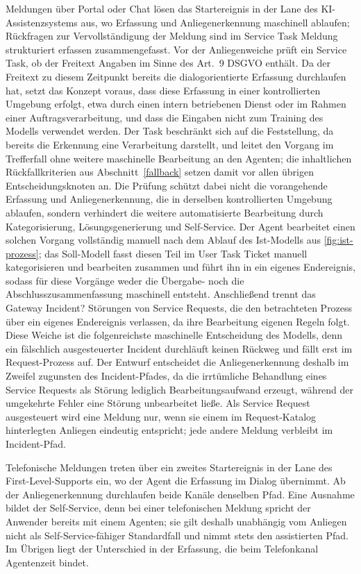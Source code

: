 Meldungen \"uber Portal oder Chat l\"osen das Startereignis in der Lane des KI-Assistenzsystems aus, wo Erfassung und Anliegenerkennung maschinell ablaufen; R\"uckfragen zur Vervollst\"andigung der Meldung sind im Service Task \glqq Meldung strukturiert erfassen\grqq{} zusammengefasst. Vor der Anliegenweiche pr\"uft ein Service Task, ob der Freitext Angaben im Sinne des Art.~9 DSGVO enth\"alt. Da der Freitext zu diesem Zeitpunkt bereits die dialogorientierte Erfassung durchlaufen hat, setzt das Konzept voraus, dass diese Erfassung in einer kontrollierten Umgebung erfolgt, etwa durch einen intern betriebenen Dienst oder im Rahmen einer Auftragsverarbeitung, und dass die Eingaben nicht zum Training des Modells verwendet werden. Der Task beschr\"ankt sich auf die Feststellung, da bereits die Erkennung eine Verarbeitung darstellt, und leitet den Vorgang im Trefferfall ohne weitere maschinelle Bearbeitung an den Agenten; die inhaltlichen R\"uckfallkriterien aus Abschnitt~\ref{fallback} setzen damit vor allen \"ubrigen Entscheidungsknoten an. Die Pr\"ufung sch\"utzt dabei nicht die vorangehende Erfassung und Anliegenerkennung, die in derselben kontrollierten Umgebung ablaufen, sondern verhindert die weitere automatisierte Bearbeitung durch Kategorisierung, L\"osungsgenerierung und Self-Service. Der Agent bearbeitet einen solchen Vorgang vollst\"andig manuell nach dem Ablauf des Ist-Modells aus \autoref{fig:ist-prozess}; das Soll-Modell fasst diesen Teil im User Task \glqq Ticket manuell kategorisieren und bearbeiten\grqq{} zusammen und f\"uhrt ihn in ein eigenes Endereignis, sodass f\"ur diese Vorg\"ange weder die \"Ubergabe- noch die Abschlusszusammenfassung maschinell entsteht. Anschlie{\ss}end trennt das Gateway \glqq Incident?\grqq{} St\"orungen von Service Requests, die den betrachteten Prozess \"uber ein eigenes Endereignis verlassen, da ihre Bearbeitung eigenen Regeln folgt. Diese Weiche ist die folgenreichste maschinelle Entscheidung des Modells, denn ein f\"alschlich ausgesteuerter Incident durchl\"auft keinen R\"uckweg und f\"allt erst im Request-Prozess auf. Der Entwurf entscheidet die Anliegenerkennung deshalb im Zweifel zugunsten des Incident-Pfades, da die irrt\"umliche Behandlung eines Service Requests als St\"orung lediglich Bearbeitungsaufwand erzeugt, w\"ahrend der umgekehrte Fehler eine St\"orung unbearbeitet lie{\ss}e. Als Service Request ausgesteuert wird eine Meldung nur, wenn sie einem im Request-Katalog hinterlegten Anliegen eindeutig entspricht; jede andere Meldung verbleibt im Incident-Pfad.

Telefonische Meldungen treten \"uber ein zweites Startereignis in der Lane des First-Level-Supports ein, wo der Agent die Erfassung im Dialog \"ubernimmt. Ab der Anliegenerkennung durchlaufen beide Kan\"ale denselben Pfad. Eine Ausnahme bildet der Self-Service, denn bei einer telefonischen Meldung spricht der Anwender bereits mit einem Agenten; sie gilt deshalb unabh\"angig vom Anliegen nicht als Self-Service-f\"ahiger Standardfall und nimmt stets den assistierten Pfad. Im \"Ubrigen liegt der Unterschied in der Erfassung, die beim Telefonkanal Agentenzeit bindet.

